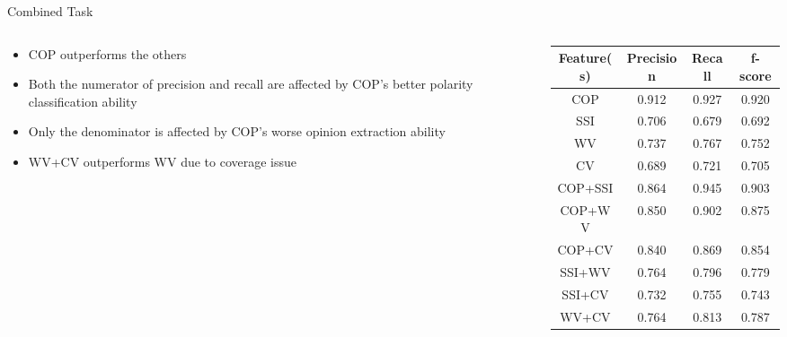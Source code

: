 \documentclass[compress]{beamer}
\begin{document}
        \begin{frame}{Combined Task}
            \begin{columns}
                \begin{column}[T]{.5\textwidth}
                    \begin{itemize}
                        \item COP outperforms the others
                        \item Both the numerator of precision and recall are affected by COP’s better polarity classification ability
                        \item Only the denominator is affected by COP's worse opinion  extraction  ability
                        \item WV+CV outperforms WV due to coverage issue
                    \end{itemize}
                \end{column}
                \begin{column}[T]{.6\textwidth}
                    \begin{table}
                    \small
                    \centering
                    \tabcolsep=0.1cm
                    \begin{tabular}{cccc}
                    \hline
                    Feature(s) & Precision & Recall & f-score \\ \hline
                    COP        & 0.912     & 0.927  & 0.920   \\ \hline
                    SSI        & 0.706     & 0.679  & 0.692   \\ \hline
                    WV         & 0.737     & 0.767  & 0.752   \\ \hline
                    CV         & 0.689     & 0.721  & 0.705   \\ \hline
                    COP+SSI    & 0.864     & 0.945  & 0.903   \\ \hline
                    COP+WV     & 0.850     & 0.902  & 0.875   \\ \hline
                    COP+CV     & 0.840     & 0.869  & 0.854   \\ \hline
                    SSI+WV     & 0.764     & 0.796  & 0.779   \\ \hline
                    SSI+CV     & 0.732     & 0.755  & 0.743   \\ \hline
                    WV+CV      & 0.764     & 0.813  & 0.787   \\ \hline
                    \end{tabular}
                    \end{table}
                \end{column}
            \end{columns}
        \end{frame}
\end{document}
